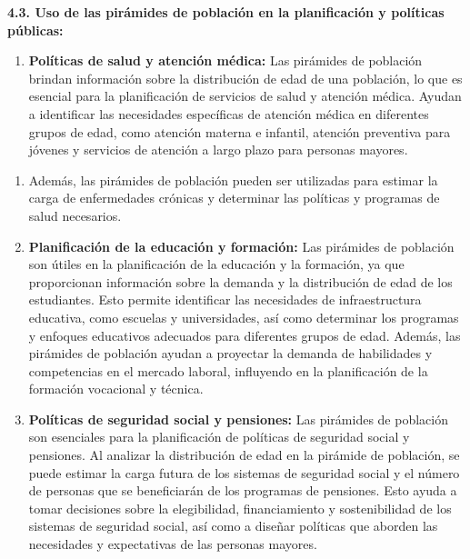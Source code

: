 \documentclass[8pt,a4paper]{beamer}
\begin{document}
{\begin{frame}{}
\begin{block}{\textbf{4.3. Uso de las pirámides de población en la planificación y políticas públicas:}}
\begin{enumerate}
\item[\ding{102}] \textbf{Políticas de salud y atención médica:} Las pirámides de población brindan información sobre la distribución de edad de una población, lo que es esencial para la planificación de servicios de salud y atención médica. Ayudan a identificar las necesidades específicas de atención médica en diferentes grupos de edad, como atención materna e infantil, atención preventiva para jóvenes y servicios de atención a largo plazo para personas mayores. 
\end{enumerate}
\end{block}
\end{frame}

\begin{frame}{}
\begin{block}{}
\justifying

\begin{enumerate}
\justifying
\item[{}] Además, las pirámides de población pueden ser utilizadas para estimar la carga de enfermedades crónicas y determinar las políticas y programas de salud necesarios.
\item[\ding{102}] \textbf{Planificación de la educación y formación:} Las pirámides de población son útiles en la planificación de la educación y la formación, ya que proporcionan información sobre la demanda y la distribución de edad de los estudiantes. Esto permite identificar las necesidades de infraestructura educativa, como escuelas y universidades, así como determinar los programas y enfoques educativos adecuados para diferentes grupos de edad. Además, las pirámides de población ayudan a proyectar la demanda de habilidades y competencias en el mercado laboral, influyendo en la planificación de la formación vocacional y técnica.

\item[\ding{102}] \textbf{Políticas de seguridad social y pensiones:} Las pirámides de población son esenciales para la planificación de políticas de seguridad social y pensiones. Al analizar la distribución de edad en la pirámide de población, se puede estimar la carga futura de los sistemas de seguridad social y el número de personas que se beneficiarán de los programas de pensiones. Esto ayuda a tomar decisiones sobre la elegibilidad, financiamiento y sostenibilidad de los sistemas de seguridad social, así como a diseñar políticas que aborden las necesidades y expectativas de las personas mayores.
\end{enumerate}
\end{block}
\end{frame}


}
\end{document}
